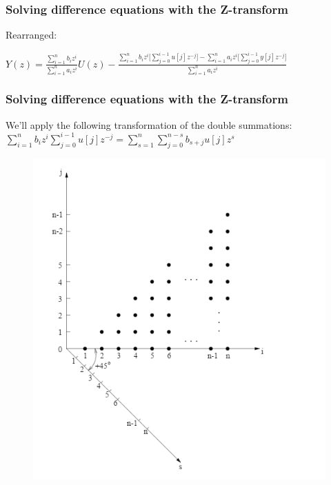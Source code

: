 \begin{frame}
		\frametitle{Solving difference equations with the Z-transform}
		Rearranged:
		\begin{center}
			$Y(z) = \frac{\sum\limits_{i=1}^{n} b_i z^i}{\sum\limits_{i=1}^{n} a_i z^i} U(z) - \frac{\sum\limits_{i=1}^{n} b_i z^i \Bigg[\sum\limits_{j=0}^{i-1}u[j]z^{-j}\Bigg]-\sum\limits_{i=1}^{n} a_i z^i \Bigg[\sum\limits_{j=0}^{i-1}y[j]z^{-j}\Bigg]}{\sum\limits_{i=1}^{n} a_i z^i}$
		\end{center}
\end{frame}
\begin{frame}
	\frametitle{Solving difference equations with the Z-transform}
	We'll apply the following transformation of the double summations:\\
	$ \sum\limits_{i=1}^{n} b_i z^i \sum\limits_{j=0}^{i-1}u[j]z^{-j} = \sum\limits_{s=1}^{n}\sum\limits_{j=0}^{n-s}b_{s+j}u[j]	z^{s}$
	\begin{figure}
	\centering
	\includegraphics[height = 0.6\textheight]{Images/discrete_time_systems_26}
	\label{fig:discrete_time_systems_26}
	\end{figure}

\end{frame}
